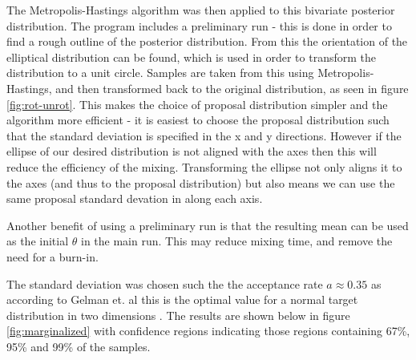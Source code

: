 \documentclass[a4paper,11pt,twoside]{article}
\begin{document}
The Metropolis-Hastings algorithm was then applied to this bivariate posterior
distribution. The program includes a preliminary run - this is done in order
to find a rough outline of the posterior distribution. From this the
orientation of the elliptical distribution can be found, which is used in order
to transform the distribution to a unit circle. Samples are taken from this
using Metropolis-Hastings, and then transformed back to the original
distribution, as seen in figure \ref{fig:rot-unrot}. 
This makes the choice of proposal distribution simpler and the
algorithm more efficient - it is easiest to choose the proposal distribution
such that the standard deviation is specified in the x and y directions.
However if the ellipse of our desired distribution is not aligned with the axes
then this will reduce the efficiency of the mixing. Transforming the ellipse
not only aligns it to the axes (and thus to the proposal distribution) but also
means we can use the same proposal standard devation in along each axis.

Another benefit of using a preliminary run is that the resulting mean can be used
as the initial $\theta$ in the main run. This may reduce mixing time, and
remove the need for a burn-in\cite{handbook}.

The standard deviation was chosen such the the acceptance rate $a \approx 0.35$
as according to Gelman et. al this is the optimal value for a
normal target distribution in two dimensions \cite{acceptance}.
The results are shown below in figure \ref{fig:marginalized} with confidence regions indicating those
regions containing 67\%, 95\% and 99\% of the samples.

\end{document}
